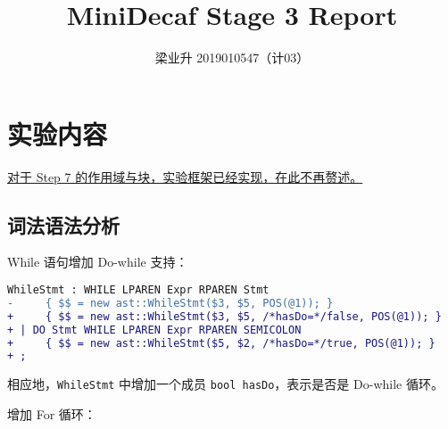 \documentclass[a4paper]{article}
\author{梁业升 2019010547（计03）}
\begin{document}


\title{MiniDecaf Stage 3 Report}

\maketitle

\section{实验内容}

\underline{对于 Step 7 的作用域与块，实验框架已经实现，在此不再赘述。}

\subsection{词法语法分析}

While 语句增加 Do-while 支持：

\begin{lstlisting}[language=diff]
  WhileStmt : WHILE LPAREN Expr RPAREN Stmt
-     { $$ = new ast::WhileStmt($3, $5, POS(@1)); }
+     { $$ = new ast::WhileStmt($3, $5, /*hasDo=*/false, POS(@1)); }
+ | DO Stmt WHILE LPAREN Expr RPAREN SEMICOLON
+     { $$ = new ast::WhileStmt($5, $2, /*hasDo=*/true, POS(@1)); }
+ ;
\end{lstlisting}

相应地，\texttt{WhileStmt} 中增加一个成员 \texttt{bool hasDo}，表示是否是 Do-while 循环。

增加 For 循环：
\end{document}
